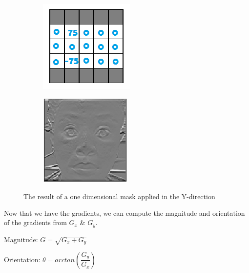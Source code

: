 \begin{figure}[H]
\centering
\begin{subfigure}{.5\textwidth}
  \centering
  \includegraphics[width=.4\linewidth]{gy}
  \label{fig:sub1}
\end{subfigure}%
\begin{subfigure}{.5\textwidth}
  \centering
  \includegraphics[width=.4\linewidth]{dy}
  \label{fig:sub2}
\end{subfigure}
\caption{The result of a one dimensional mask applied in the Y-direction}
\label{fig:test}
\end{figure}


Now that we have the gradients, we can compute the magnitude and orientation of the gradients from  $G_x$ \& $G_y$.

Magnitude: $G = \sqrt{G_x + G_y}$

Orientation: $\theta = arctan(\dfrac{G_y}{G_x})$

